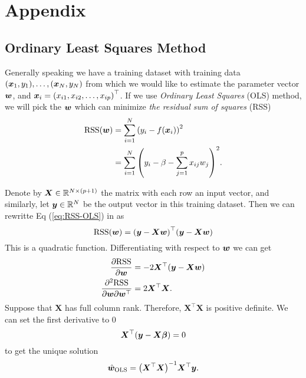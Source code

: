\section{Appendix}\label{app}

\subsection{Ordinary Least Squares Method}\label{app:OLS}


Generally speaking we have a training dataset with training data \((\bm{x}_1, y_1), \dots, 
(\bm{x}_N, y_N)\) from which we would like to estimate the parameter vector \(\bm{w}\), and
\(\bm{x}_i = {(x_{i1}, x_{i2}, \dots, x_{ip})}^\top\).
If we use \emph{Ordinary Least Squares} (OLS) method, we will pick the \(\bm{w}\) which can
minimize \emph{the residual sum of squares} (RSS)
\begin{equation}\label{eq:RSS-OLS}
    \begin{aligned}
        \mathrm{RSS} (\bm{w}) &= \sum_{i=1}^N {(y_i - f(\bm{x}_i))}^2 \\
        &= \sum_{i=1}^N {\left( y_i - \beta - \sum_{j=1}^p x_{ij}w_j \right)}^2.
    \end{aligned}
\end{equation}

Denote by \(\bm{X} \in \mathbb{R}^{N \times (p + 1)}\) the matrix with each row an input vector, and similarly, let 
\(\bm{y} \in \mathbb{R}^N\) be the output vector in this training dataset. Then we can rewritte Eq (\ref{eq:RSS-OLS}) in
as
\begin{equation}\label{eq:RSS-OLS-mat}
    \mathrm{RSS}(\bm{w}) = {(\bm{y} - \bm{Xw})}^\top(\bm{y} - \bm{Xw}) 
\end{equation}
This is a quadratic function. Differentiating with respect to \(\bm{w}\) we can get 
\begin{equation}
    \begin{aligned}
        \pdv{\mathrm{RSS}}{\bm{w}} &= -2 \bm{X}^\top (\bm{y} - \bm{Xw}) \\
        \pdv{\mathrm{RSS}}{\bm{w}}{\bm{w}^\top} &= 2\bm{X}^\top \bm{X}.
    \end{aligned}
\end{equation}
Suppose that \(\bm{X}\) has full column rank. Therefore, \(\bm{X}^\top\bm{X}\) is positive definite.
We can set the first derivative to \(0\)
\begin{equation}
    \bm{X}^\top (\bm{y} - \bm{X\beta}) = 0
\end{equation}
to get the unique solution
\begin{equation}\label{eq:solution-OLS-app}
    \hat{\bm{w}}_{\text{OLS}} = {\left(\bm{X}^\top \bm{X}\right)}^{-1} \bm{X}^\top \bm{y}.
\end{equation}

